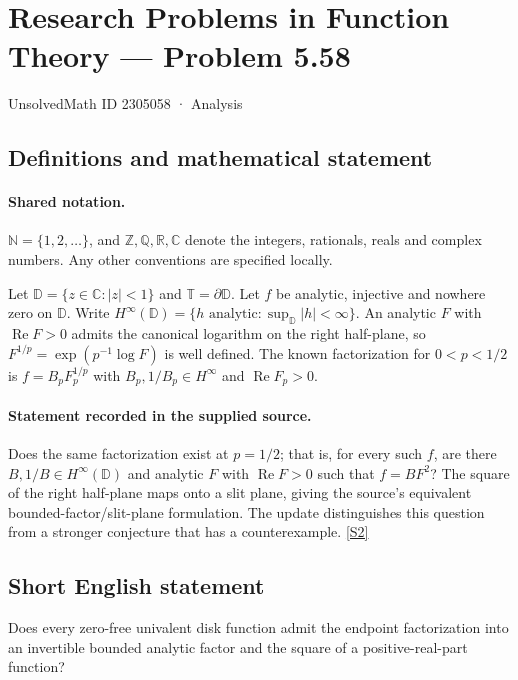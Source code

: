 \documentclass[11pt]{book}
\newcommand{\sref}[2]{\hyperlink{source:#1:#2}{[S#2]}}
\begin{document}
\setcounter{section}{2305057}
\section{Research Problems in Function Theory — Problem 5.58}\label{2305058}
{\small\sffamily UnsolvedMath ID 2305058 · Analysis}
\subsection{Definitions and mathematical statement}

\paragraph{Shared notation.}$\mathbb N=\{1,2,\ldots\}$, and $\mathbb Z,\mathbb Q,\mathbb R,\mathbb C$ denote the integers, rationals, reals and complex numbers. Any other conventions are specified locally.


Let $\mathbb D=\{z\in\mathbb C:|z|<1\}$ and $\mathbb T=\partial\mathbb D$. Let $f$ be analytic, injective and nowhere zero on $\mathbb D$. Write $H^{\infty}(\mathbb D)=\{h\text{ analytic}:\sup_{\mathbb D}|h|<\infty\}$. An analytic $F$ with $\operatorname{Re}F>0$ admits the canonical logarithm on the right half-plane, so $F^{1/p}=\exp(p^{-1}\log F)$ is well defined. The known factorization for $0<p<1/2$ is $f=B_pF_p^{1/p}$ with $B_p,1/B_p\in H^{\infty}$ and $\operatorname{Re}F_p>0$.
\paragraph{Statement recorded in the supplied source.}
Does the same factorization exist at $p=1/2$; that is, for every such $f$, are there $B,1/B\in H^{\infty}(\mathbb D)$ and analytic $F$ with $\operatorname{Re}F>0$ such that $f=BF^2$? The square of the right half-plane maps onto a slit plane, giving the source’s equivalent bounded-factor/slit-plane formulation. The update distinguishes this question from a stronger conjecture that has a counterexample. \sref{2305058}{2}
\subsection{Short English statement}
Does every zero-free univalent disk function admit the endpoint factorization into an invertible bounded analytic factor and the square of a positive-real-part function?
\end{document}
